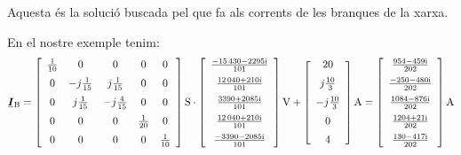 \begin{list}{}
   Aquesta és la solució buscada pel que fa als corrents de les branques de la xarxa.

   En el nostre exemple tenim:
   \[
   \mcmplx{I}\ped{B} =
   \begin{bmatrix}\begin{array}{ccccc}
         \frac{1}{10} & 0 & 0 & 0 & 0 \\[2mm]
         0 & -j \frac{1}{15} & j \frac{1}{15} & 0 & 0 \\[2mm]
         0 & j \frac{1}{15} & -j \frac{4}{15} & 0 & 0 \\[2mm]
         0 & 0 & 0 & \frac{1}{20} & 0 \\[2mm]
         0 & 0 & 0 & 0 & \frac{1}{10}
   \end{array}\end{bmatrix}\unit{S} \cdot
   \begin{bmatrix}\begin{array}{c}
           \frac{\complexnum{ -15430 - j 2295}}{101} \\[2mm]
           \frac{\complexnum{12040 + j 210}}{101}  \\[2mm]
           \frac{\complexnum{3390 + j 2085}}{101} \\[2mm]
           \frac{\complexnum{ 12040 + j 210}}{101}  \\[2mm]
           \frac{\complexnum{ -3390 - j 2085}}{101}
     \end{array}\end{bmatrix}\unit{V}
   + \begin{bmatrix}\begin{array}{c}
         20 \\[2mm]
         j \frac{10}{3} \\[2mm]
         -j \frac{10}{3} \\[2mm]
         0 \\[2mm]
         4
     \end{array}\end{bmatrix}\unit{A} =
     \begin{bmatrix}\begin{array}{c}
      \frac{\complexnum{ 954 - j 459}}{202} \\[2mm]
      \frac{\complexnum{-250 - j 480}}{202}  \\[2mm]
      \frac{\complexnum{1084 - j 876}}{202} \\[2mm]
      \frac{\complexnum{1204 + j 21}}{202}  \\[2mm]
      \frac{\complexnum{130 - j 417}}{202}
    \end{array}\end{bmatrix}\unit{A}
	\label{eq:ib-exemp}
   \]

\end{list}


